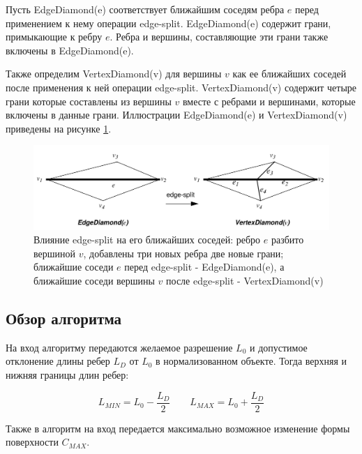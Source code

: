 \documentclass[14pt]{article}
\numberwithin{figure}{section}
\numberwithin{equation}{section}
\begin{document}
Пусть EdgeDiamond(e) соответствует ближайшим соседям ребра $e$ перед применением к нему операции edge-split. EdgeDiamond(e) содержит грани, примыкающие к ребру $e$. Ребра и вершины, составляющие эти грани также включены в EdgeDiamond(e).

Также определим VertexDiamond(v) для вершины $v$ как ее ближайших соседей после применения к ней операции edge-split. VertexDiamond(v) содержит четыре грани которые составлены из вершины $v$ вместе с ребрами и вершинами, которые включены в данные грани. Иллюстрации EdgeDiamond(e) и VertexDiamond(v) приведены на рисунке \ref{ris:mc3}.

\begin{figure}
	\begin{center}
		\includegraphics[scale = 0.25]{mc3.JPG}
		\caption{Влияние edge-split на его ближайших соседей: ребро $e$ разбито вершиной $v$, добавлены три новых ребра две новые грани; ближайшие соседи $e$ перед edge-split - EdgeDiamond(e), а ближайшие соседи вершины $v$ после edge-split - VertexDiamond(v)}
		\label{ris:mc3}
	\end{center}
\end{figure}

\subsection{Обзор алгоритма}

На вход алгоритму передаются желаемое разрешение $L_0$ и допустимое отклонение длины ребер $L_D$ от $L_0$ в нормализованном объекте. Тогда верхняя и нижняя границы длин ребер:

\begin{equation}
	L_{MIN} = L_0 - \frac{L_D}{2} \qquad L_{MAX} = L_0 + \frac{L_D}{2}
\end{equation}

Также в алгоритм на вход передается максимально возможное изменение формы поверхности $C_{MAX}$.
\end{document}
